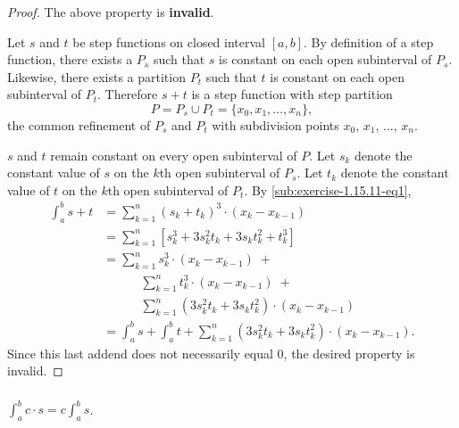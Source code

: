 \documentclass{report}
\begin{document}
\begin{proof}

  The above property is \textbf{invalid}.

  \vspace{6pt}

  Let $s$ and $t$ be step functions on closed interval $[a, b]$.
  By definition of a step function, there exists a 
    $P_s$ such that $s$ is constant on each open subinterval of $P_s$.
  Likewise, there exists a partition $P_t$ such that $t$ is constant on each
    open subinterval of $P_t$.
  Therefore $s + t$ is a step function with step partition
    $$P = P_s \cup P_t = \{x_0, x_1, \ldots, x_n\},$$
    the common refinement of $P_s$ and $P_t$ with subdivision points
    $x_0$, $x_1$, $\ldots$, $x_n$.

  $s$ and $t$ remain constant on every open subinterval of $P$.
  Let $s_k$ denote the constant value of $s$ on the $k$th open subinterval of
    $P_s$.
  Let $t_k$ denote the constant value of $t$ on the $k$th open subinterval of
    $P_t$.
  By \eqref{sub:exercise-1.15.11-eq1},
    \begin{align*}
      \int_a^b s + t
        & = \sum_{k=1}^n (s_k + t_k)^3 \cdot (x_k - x_{k-1}) \\
        & = \sum_{k=1}^n
            \left[ s_k^3 + 3s_k^2t_k + 3s_kt_k^2 + t_k^3 \right] \\
        & = \sum_{k=1}^n s_k^3 \cdot (x_k - x_{k-1}) \;+ \\
          & \quad\qquad
            \sum_{k=1}^n t_k^3 \cdot (x_k - x_{k-1}) \;+ \\
          & \quad\qquad
            \sum_{k=1}^n (3s_k^2t_k + 3s_kt_k^2) \cdot (x_k - x_{k - 1}) \\
        & = \int_a^b s + \int_a^b t +
            \sum_{k=1}^n (3s_k^2t_k + 3s_kt_k^2) \cdot (x_k - x_{k - 1}).
    \end{align*}
  Since this last addend does not necessarily equal $0$, the desired property is
    invalid.

\end{proof}

\subsubsection{}%
\label{ssub:exercise-1.15.11c}

$\int_a^b c \cdot s = c \int_a^b s$.

\end{document}

